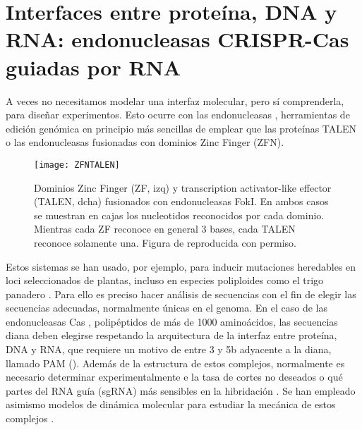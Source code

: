
\section{Interfaces entre prote\'{i}na, DNA y RNA: endonucleasas CRISPR-Cas guiadas por RNA} \label{CRISPR}

A veces no necesitamos modelar una interfaz molecular, pero s\'{i} comprenderla, para dise\~{n}ar experimentos.
Esto ocurre con las endonucleasas , 
herramientas de edici\'{o}n gen\'{o}mica en principio 
m\'{a}s sencillas de emplear que las prote\'{i}nas TALEN o las endonucleasas fusionadas con dominios Zinc Finger (ZFN).

\begin{figure}
\begin{center} 
\texttt{[image: ZFNTALEN]}
\caption%
{
Dominios Zinc Finger (ZF, izq) y transcription activator-like effector (TALEN, dcha) fusionados con endonucleasas FokI.
En ambos casos se muestran en cajas los nucleotidos reconocidos por cada dominio. 
Mientras cada ZF reconoce en general 3 bases, cada TALEN reconoce solamente una.
Figura de \cite{Gaj2013} reproducida con permiso.
}
\label{fig:ZFNTALEN}
\end{center}
\end{figure}

Estos sistemas se han usado, por ejemplo, para inducir mutaciones heredables en loci seleccionados de plantas, incluso en especies poliploides
como el trigo panadero \citep{Wang2014,Lawrenson2015}. 
Para ello es preciso hacer an\'{a}lisis de secuencias con el fin de elegir las secuencias adecuadas, 
normalmente \'{u}nicas en el genoma. 
En el caso de las endonucleasas Cas \citep{Stella2017}, polip\'{e}ptidos de m\'{a}s de 1000 amino\'{a}cidos,
las secuencias diana deben elegirse respetando la arquitectura 
de la interfaz entre prote\'{i}na, DNA y RNA, que requiere un motivo de entre 3 y 5b adyacente a la diana,
llamado PAM (). Adem\'{a}s de la estructura de estos complejos, 
normalmente es necesario determinar experimentalmente  e  la 
tasa de cortes no deseados o qu\'{e} partes del RNA gu\'{i}a (sgRNA) m\'{a}s sensibles en la hibridaci\'{o}n \citep{Cisse2012,Zheng2017}.
Se han empleado asimismo modelos de din\'{a}mica molecular para estudiar la mec\'{a}nica de estos complejos \citep{Zheng2017w}.

